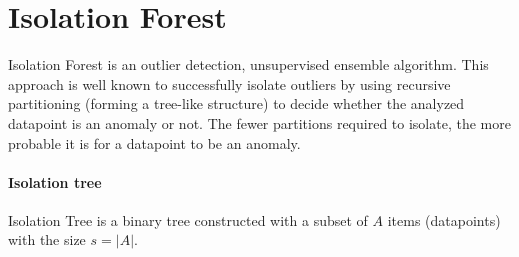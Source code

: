 \section{Isolation Forest}
\label{sec:isolation_forest}

Isolation Forest
\cite{liu2008isolation} \cite{liu2012isolation} is an outlier
detection, unsupervised ensemble algorithm. This approach is well known to successfully isolate outliers by using recursive partitioning (forming a tree-like structure) to decide whether the analyzed datapoint is an anomaly or not. The fewer partitions required to isolate, the more probable it is for a datapoint to be an anomaly.

\paragraph{Isolation tree}
Isolation Tree is a binary tree constructed with a subset of \(A\) items
(datapoints) with the size \(s=|A|\).

